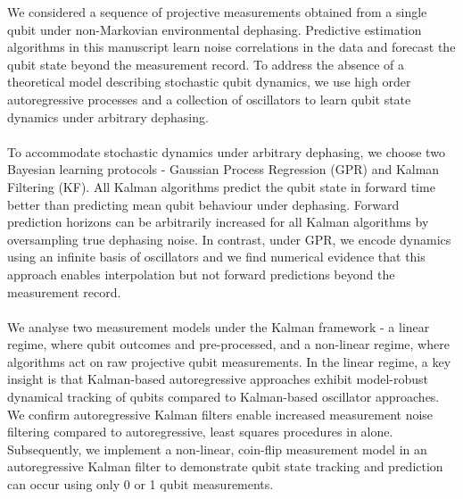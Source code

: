 We considered a sequence of projective measurements obtained from a single qubit under non-Markovian environmental dephasing. Predictive estimation algorithms in this manuscript learn noise correlations in the data and forecast the qubit state beyond the measurement record. To address the absence of a theoretical model describing stochastic qubit dynamics, we use high order autoregressive processes and a collection of oscillators to learn qubit state dynamics under arbitrary dephasing. 
\\
\\
To accommodate stochastic dynamics under arbitrary dephasing, we choose two Bayesian learning protocols - Gaussian Process Regression (GPR) and Kalman Filtering (KF).  All Kalman algorithms predict the qubit state in forward time better than predicting mean qubit behaviour under dephasing.  Forward prediction horizons can be arbitrarily increased for all Kalman algorithms by oversampling true dephasing noise.  In contrast, under GPR, we encode dynamics using an infinite basis of oscillators and we find numerical evidence that this approach enables interpolation but not forward predictions beyond the measurement record.  
\\
\\
We analyse two measurement models under the Kalman framework - a linear regime, where qubit outcomes and pre-processed, and a non-linear regime, where algorithms act on raw projective qubit measurements. In the linear regime, a key insight is that Kalman-based autoregressive approaches exhibit model-robust dynamical tracking of qubits compared to Kalman-based oscillator approaches. We confirm autoregressive Kalman filters enable increased measurement noise filtering compared to autoregressive, least squares procedures in \cite{mavadia2017} alone. Subsequently, we implement a non-linear, coin-flip measurement model in an autoregressive Kalman filter to demonstrate qubit state tracking and prediction can occur using only 0 or 1 qubit measurements. 
\\
\\
